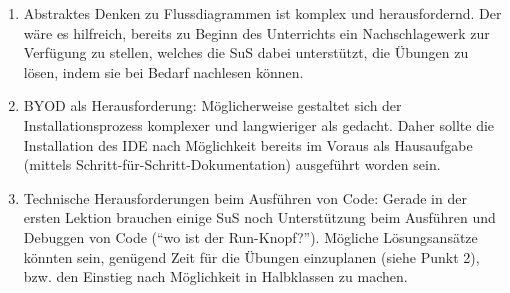 \begin{myExBox}
	\begin{myExBox}[title=Mögliche Schwierigkeiten \& geeignete Massnahmen]
		\begin{enumerate}
			\item Abstraktes Denken zu Flussdiagrammen ist komplex und herausfordernd. Der wäre es hilfreich, bereits zu Beginn des Unterrichts ein Nachschlagewerk zur Verfügung zu stellen, welches die SuS dabei unterstützt, die Übungen zu lösen, indem sie bei Bedarf nachlesen können.
			\item BYOD als Herausforderung: Möglicherweise gestaltet sich der Installationsprozess komplexer und langwieriger als gedacht. Daher sollte die Installation des IDE nach Möglichkeit bereits im Voraus als Hausaufgabe (mittels Schritt-für-Schritt-Dokumentation) ausgeführt worden sein.
			\item Technische Herausforderungen beim Ausführen von Code: Gerade in der ersten Lektion brauchen einige SuS noch Unterstützung beim Ausführen und Debuggen von Code (\enquote{wo ist der Run-Knopf?}). Mögliche Lösungsansätze könnten sein, genügend Zeit für die Übungen einzuplanen (siehe Punkt 2), bzw. den Einstieg nach Möglichkeit in Halbklassen zu machen.
		\end{enumerate}
	\end{myExBox}
\end{myExBox}
\newpage

